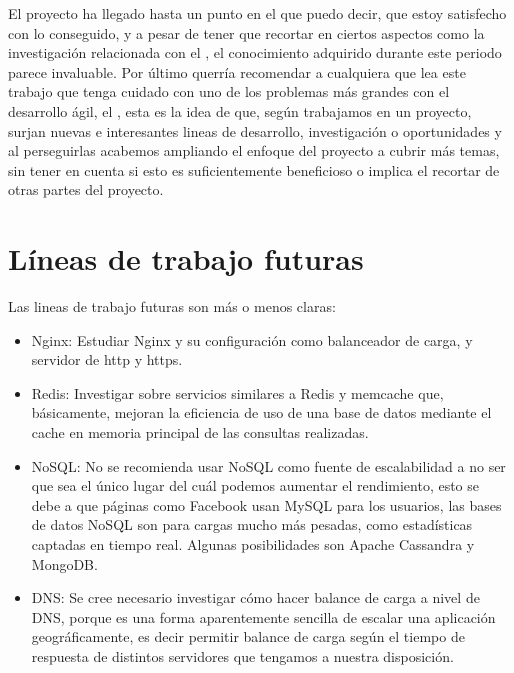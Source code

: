 El proyecto ha llegado hasta un punto en el que puedo decir, que estoy satisfecho con lo conseguido, y a pesar de tener que recortar en ciertos aspectos como la investigación relacionada con el , el conocimiento adquirido durante este periodo parece invaluable. Por último querría recomendar a cualquiera que lea este trabajo que tenga cuidado con uno de los problemas más grandes con el desarrollo ágil, el , esta es la idea de que, según trabajamos en un proyecto, surjan nuevas e interesantes lineas de desarrollo, investigación o oportunidades y al perseguirlas acabemos ampliando el enfoque del proyecto a cubrir más temas, sin tener en cuenta si esto es suficientemente beneficioso o implica el recortar de otras partes del proyecto.
 

\section{Líneas de trabajo futuras}
Las lineas de trabajo futuras son más o menos claras:

\begin{itemize}
\item Nginx: Estudiar Nginx y su configuración como balanceador de carga,  y servidor de http y https. 
\item Redis: Investigar sobre servicios similares a Redis y memcache que, básicamente, mejoran la eficiencia de uso de una base de datos mediante el cache en memoria principal de las consultas realizadas.
\item NoSQL: No se recomienda usar NoSQL como fuente de escalabilidad a no ser que sea el único lugar del cuál podemos aumentar el rendimiento, esto se debe a que páginas como Facebook usan MySQL para los usuarios, las bases de datos NoSQL son para cargas mucho más pesadas, como estadísticas captadas en tiempo real. Algunas posibilidades son Apache Cassandra y MongoDB.
\item DNS: Se cree necesario investigar cómo hacer balance de carga a nivel de DNS, porque es una forma aparentemente sencilla de escalar una aplicación geográficamente, es decir permitir balance de carga según el tiempo de respuesta de distintos servidores que tengamos a nuestra disposición.
\end{itemize}

